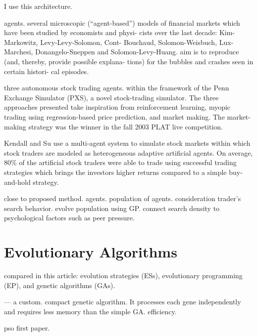 \cite{Shoham2009} I use this architecture.

\cite{Bundesbank2007} agents. several microscopic (“agent-based”) models of
financial markets which have been studied by economists and physi- cists over
the last decade: Kim-Markowitz, Levy-Levy-Solomon, Cont- Bouchaud,
Solomon-Weisbuch, Lux-Marchesi, Donangelo-Sneppen and Solomon-Levy-Huang. aim is
to reproduce (and, thereby, provide possible explana- tions) for the bubbles and
crashes seen in certain histori- cal episodes.

\cite{Sherstov2005} three autonomous stock trading agents. within the framework
of the Penn Exchange Simulator (PXS), a novel stock-trading simulator. The three
approaches presented take inspiration from reinforcement learning, myopic
trading using regression-based price prediction, and market making. The
market-making strategy was the winner in the fall 2003 PLAT live competition.

Kendall and Su \cite{Kendall2003} use a multi-agent system to simulate stock
markets within which stock traders are modeled as heterogeneous adaptive
artificial agents. On average, 80\% of the artificial stock traders were able to
trade using successful trading strategies which brings the investors higher
returns compared to a simple buy-and-hold strategy.

\cite{Chen2001} close to proposed method. agents. population of
agents. consideration trader's search behavior. evolve population using
GP. connect search density to psychological factors such as peer pressure.

\section{Evolutionary Algorithms}
\label{section:evolutionary-algorithms}

\cite{Back2008} compared in this article: evolution strategies (ESs),
evolutionary programming (EP), and genetic algorithms (GAs).

\cite{Harik1999} — a custom. compact genetic algorithm. It processes each gene
independently and requires less memory than the simple GA. efficiency.

\cite{Eberhart2002} pso first paper.

